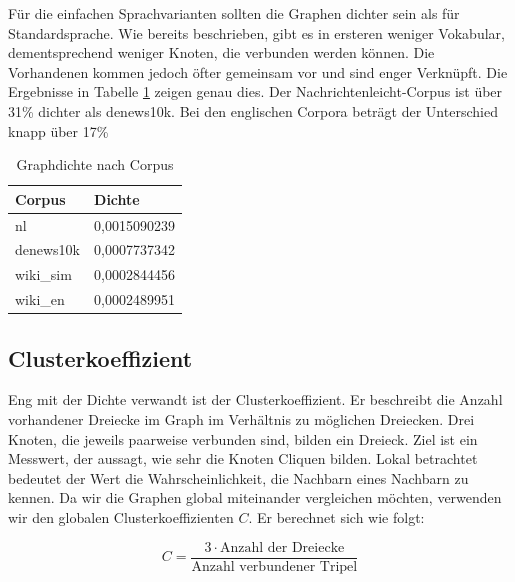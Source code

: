 \documentclass[11pt, a4paper]{article}
\begin{document}

Für die einfachen Sprachvarianten sollten die Graphen dichter sein als für
Standardsprache.
Wie bereits beschrieben, gibt es in ersteren weniger Vokabular, dementsprechend
weniger Knoten, die verbunden werden können. Die Vorhandenen kommen jedoch öfter 
gemeinsam vor und sind enger Verknüpft. Die Ergebnisse in Tabelle \ref{density_table}
zeigen genau dies. Der Nachrichtenleicht-Corpus ist über 31\% dichter als denews10k.
Bei den englischen Corpora beträgt der Unterschied knapp über 17\%

\begin{table}[h]
  \centering
  \begin{tabular}{ll}
    \toprule
    Corpus            &         Dichte       \\
    \midrule
    nl                &  		0,0015090239 \\
    denews10k         &  		0,0007737342 \\
    wiki\_sim         &  		0,0002844456 \\
    wiki\_en          &  		0,0002489951 \\
    \bottomrule
  \end{tabular}
  \caption{\label{density_table} Graphdichte nach Corpus}
\end{table}

\subsection{Clusterkoeffizient}

Eng mit der Dichte verwandt ist der Clusterkoeffizient. Er beschreibt die
Anzahl vorhandener Dreiecke im Graph im Verhältnis zu möglichen Dreiecken. Drei
Knoten, die jeweils paarweise verbunden sind, bilden ein Dreieck. Ziel ist ein
Messwert, der aussagt, wie sehr die Knoten Cliquen bilden. Lokal betrachtet
bedeutet der Wert die Wahrscheinlichkeit, die Nachbarn eines Nachbarn zu kennen.
Da wir die Graphen global miteinander vergleichen möchten, verwenden wir den
globalen Clusterkoeffizienten $C$. Er berechnet sich wie folgt:

$$
    C = \frac{3\cdot\text{Anzahl der Dreiecke}}{\text{Anzahl verbundener Tripel}}
$$
\end{document}
